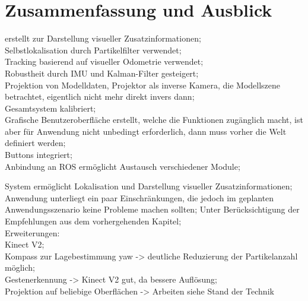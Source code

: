 \chapter{Zusammenfassung und Ausblick}
\label{chap:zusammenfassung}

\kps{} erstellt zur Darstellung visueller Zusatzinformationen;\\
Selbstlokalisation durch Partikelfilter verwendet;\\
Tracking basierend auf visueller Odometrie verwendet;\\
Robustheit durch IMU und Kalman-Filter gesteigert;\\
Projektion von Modelldaten, Projektor als inverse Kamera, die Modellszene betrachtet, eigentlich nicht mehr direkt invers dann;\\
Gesamtsystem kalibriert;\\
Grafische Benutzeroberfläche erstellt, welche die Funktionen zugänglich macht, ist aber für Anwendung nicht unbedingt erforderlich, dann muss vorher die Welt definiert werden;\\
Buttons integriert;\\
Anbindung an ROS ermöglicht Austausch verschiedener Module;

System ermöglicht Lokalisation und Darstellung visueller Zusatzinformationen;\\
Anwendung unterliegt ein paar Einschränkungen, die jedoch im geplanten Anwendungsszenario keine Probleme machen sollten; Unter Berücksichtigung der Empfehlungen aus dem vorhergehenden Kapitel;\\

Erweiterungen:\\
Kinect V2;\\
Kompass zur Lagebestimmung yaw -> deutliche Reduzierung der Partikelanzahl möglich;\\
Gestenerkennung -> Kinect V2 gut, da bessere Auflösung;\\
Projektion auf beliebige Oberflächen -> Arbeiten siehe Stand der Technik\\
